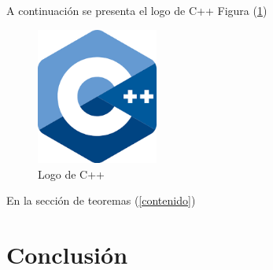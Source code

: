 \documentclass{article}
\begin{document}
A continuación se presenta el logo de C++ Figura (\ref{fig:cpplogo})

\begin{figure}[h]
\includegraphics[width=4cm]{cpplogo.png}
\centering
\caption{Logo de C++}
\label{fig:cpplogo}
\end{figure}

En la sección de teoremas (\ref{contenido})

\section{Conclusión} \label{conclulsion}



\end{document}
